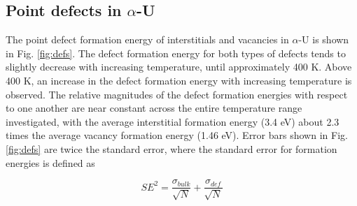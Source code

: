 \documentclass[review]{elsarticle}
\begin{document}

\FloatBarrier

\subsection{Point defects in $\alpha$-U}

The point defect formation energy of interstitials and vacancies in $\alpha$-U is shown in Fig. \ref{fig:defs}. The defect formation energy for both types of defects tends to slightly decrease with increasing temperature, until approximately 400 K. Above 400 K, an increase in the defect formation energy with increasing temperature is observed. The relative magnitudes of the defect formation energies with respect to one another are near constant across the entire temperature range investigated, with the average interstitial formation energy (3.4 eV) about 2.3 times the average vacancy formation energy (1.46 eV). Error bars shown in Fig. \ref{fig:defs} are twice the standard error, where the standard error for formation energies is defined as 

\begin{equation}
\label{eq:surf}
SE^2 = \frac{\sigma_{bulk}}{\sqrt{N}} + \frac{\sigma_{def}}{\sqrt{N}}
\end{equation}
\end{document}
